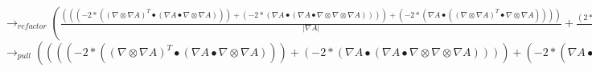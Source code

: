\documentclass{article}
\begin{document}
\newline $\rightarrow_{refactor}( \frac{(((-2*(( \nabla  \otimes  \nabla A)^T \bullet ( \nabla A \bullet  \nabla  \otimes  \nabla A)))+(-2*( \nabla A \bullet ( \nabla A \bullet  \nabla  \otimes  \nabla  \otimes  \nabla A))))+(-2*( \nabla A \bullet (( \nabla  \otimes  \nabla A)^T \bullet  \nabla  \otimes  \nabla A))))}{| \nabla A|}+ \frac{(2*( \nabla A \bullet ( \nabla A \bullet  \nabla  \otimes  \nabla A))*( \nabla A \bullet  \nabla  \otimes  \nabla A))}{(| \nabla A|*( \nabla A \bullet  \nabla A))})$\\
\newline $\rightarrow_{pull}((((-2*(( \nabla  \otimes  \nabla A)^T \bullet ( \nabla A \bullet  \nabla  \otimes  \nabla A)))+(-2*( \nabla A \bullet ( \nabla A \bullet  \nabla  \otimes  \nabla  \otimes  \nabla A))))+(-2*( \nabla A \bullet (( \nabla  \otimes  \nabla A)^T \bullet  \nabla  \otimes  \nabla A))))* \frac{1}{| \nabla A|}+(2*( \nabla A \bullet ( \nabla A \bullet  \nabla  \otimes  \nabla A))*( \nabla A \bullet  \nabla  \otimes  \nabla A))* \frac{1}{(| \nabla A|*( \nabla A \bullet  \nabla A))})$
\end{document}
